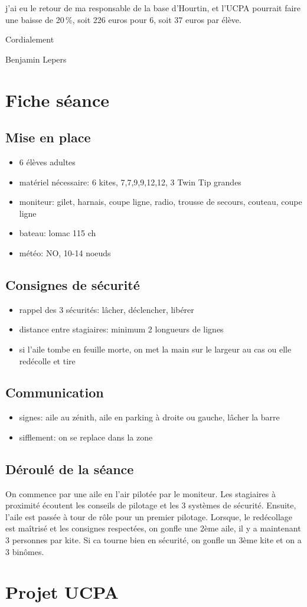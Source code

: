 \documentclass[11pt,a4paper]{report}
\begin{document}
j'ai eu le retour de ma responsable de la base d'Hourtin, et l'UCPA
pourrait faire une baisse de 20\,\%, soit 226 euros pour 6, soit 37 euros
par élève.

Cordialement

Benjamin Lepers
\chapter{Fiche séance\label{fiche_seance}}
\section{Mise en place}
\begin{itemize}
\item 6 élèves adultes
\item matériel nécessaire: 6 kites, 7,7,9,9,12,12, 3 Twin Tip grandes
\item moniteur: gilet, harnais, coupe ligne, radio, trousse de secours, couteau, coupe ligne
\item bateau: lomac 115 ch
\item météo: NO, 10-14 noeuds
\end{itemize}
\section{Consignes de sécurité}
\begin{itemize}
\item rappel des 3 sécurités: lâcher, déclencher, libérer
\item distance entre stagiaires: minimum 2 longueurs de lignes
\item si l'aile tombe en feuille morte, on met la main sur le largeur au cas ou elle redécolle et tire
\end{itemize}
\section{Communication}
\begin{itemize}
\item signes: aile au zénith, aile en parking à droite ou gauche, lâcher la barre
\item sifflement: on se replace dans la zone
\end{itemize}
\section{Déroulé de la séance}
On commence par une aile en l'air pilotée par le moniteur.
Les stagiaires à proximité écoutent les conseils de pilotage et les 3 systèmes
de sécurité.
Ensuite, l'aile est passée à tour de rôle pour un premier pilotage.
Lorsque, le redécollage est maîtrisé et les consignes respectées, 
on gonfle une 2ème aile, il y a maintenant 3 personnes par kite.
Si ca tourne bien en sécurité, on gonfle un 3ème kite et on a 3 binômes.


\chapter{Projet UCPA\label{ucpa_projet}}




\end{document}

